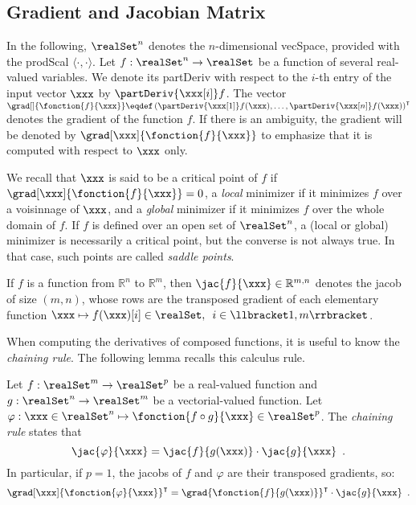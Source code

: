 \subsection{Gradient and Jacobian Matrix}
In the following, \(\realSet^n\) denotes the \(n\)-dimensional \gls{vecSpace}, provided with the \gls{prodScal} \(\langle\cdot,\cdot\rangle\).
Let \(f:\realSet^n \rightarrow \realSet\) be a function of several real-valued variables.
We denote its \gls{partDeriv} with respect to the \(i\)-th entry of the input vector \(\xxx\) by \(\partDeriv{\xxx[i]}f\).
The vector \(\grad[]{\fonction{f}{\xxx}} \eqdef \left(\partDeriv{\xxx[1]}f(\xxx), \ldots, \partDeriv{\xxx[n]}f(\xxx)\right)^\intercal\) denotes the \gls{gradient} of the function \(f\).
If there is an ambiguity, the gradient will be denoted by \(\grad[\xxx]{\fonction{f}{\xxx}}\) to emphasize that it is computed with respect to \(\xxx\) only.

We recall that \(\xxx\) is said to be a \gls{critical} point of \(f\) if \(\grad[\xxx]{\fonction{f}{\xxx}}=0\), a \emph{local} minimizer if it minimizes \(f\) over a \gls{voisinnage} of \(\xxx\), and a \emph{global} minimizer if it minimizes \(f\) over the whole domain of \(f\).
If \(f\) is defined over an open set of \(\realSet^n\), a (local or global) minimizer is necessarily a \gls{critical} point, but the converse is not always true.
In that case, such points are called \emph{saddle points}.

If \(f\) is a function from \(\mathbb{R}^n\) to \(\mathbb{R}^m\), then 
\(\jac{f}{\xxx} \in \mathbb{R}^{m, n}\) denotes the \gls{jacob} of size \((m, n)\), whose rows are the transposed gradient of each elementary function \(\xxx \mapsto f(\xxx)[i] \in \realSet, \enspace i \in \llbracket 1, m \rrbracket\).

When computing the derivatives of composed functions, it is useful to know the \emph{chaining rule}.
The following lemma recalls this calculus rule.
\begin{lemma}
    \label{lemma:chaining_rule}
    Let \(f:\realSet^m \rightarrow \realSet^p\) be a real-valued function and \(g:\realSet^n \rightarrow \realSet^m\) be a vectorial-valued function.
    Let \(\varphi: \xxx \in \realSet^n \mapsto \fonction{f \circ g}{\xxx} \in \realSet^p\).
    The \emph{chaining rule} states that
    \begin{equation}
        \jac{\varphi}{\xxx} = \jac{f}{g(\xxx)} \cdot \jac{g}{\xxx} \enspace .
        \label{eq:chain_rule}
    \end{equation}
    In particular, if \(p=1\), the \glspl{jacob} of \(f\) and \(\varphi\) are their transposed gradients, so:
    \begin{equation}
        \grad[\xxx]{\fonction{\varphi}{\xxx}}^\intercal = \grad{\fonction{f}{g(\xxx)}}^\intercal \cdot \jac{g}{\xxx}\enspace .
    \end{equation}
\end{lemma}

